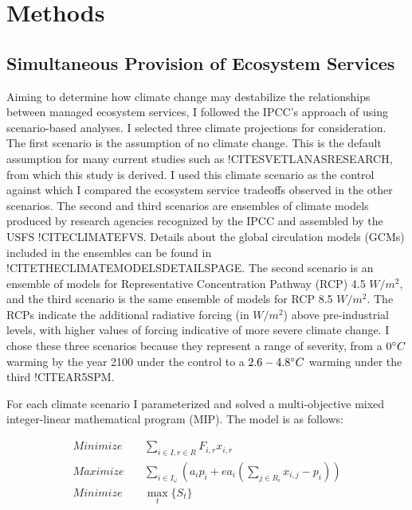 \section{Methods}
\subsection{Simultaneous Provision of Ecosystem Services}
\label{subsec:multiObjModel}
Aiming to determine how climate change may destabilize the relationships between managed ecosystem services, I followed the IPCC's approach of using scenario-based analyses. I selected three climate projections for consideration. The first scenario is the assumption of no climate change. This is the default assumption for many current studies such as !CITESVETLANASRESEARCH, from which this study is derived. I used this climate scenario as the control against which I  compared the ecosystem service tradeoffs observed in the other scenarios. The second and third scenarios are ensembles of climate models produced by research agencies recognized by the IPCC and assembled by the USFS !CITECLIMATEFVS. Details about the global circulation models (GCMs) included in the ensembles can be found in !CITETHECLIMATEMODELSDETAILSPAGE. The second scenario is an ensemble of models for Representative Concentration Pathway (RCP) 4.5 $W/m^2$, and the third scenario is the same ensemble of models for RCP 8.5 $W/m^2$. The RCPs indicate the additional radiative forcing (in $W/m^2$) above pre-industrial levels, with higher values of forcing indicative of more severe climate change. I chose these three scenarios because they represent a range of severity, from a $0 \degree C$ warming by the year 2100 under the control to a $2.6-4.8 \degree C$ warming under the third !CITEAR5SPM.

For each climate scenario I parameterized and solved a multi-objective mixed integer-linear mathematical program (MIP). The model is as follows:

\begin{align*}
Minimize \quad &\sum_{i\in I,r\in R} F_{i,r} x_{i,r} \\
Maximize \quad &\sum_{i\in I_\omega} \left(a_i p_i + e a_i \left( \sum_{j \in R_i} x_{i,j}-p_i \right) \right) \\
Minimize \quad &\max_t \{S_t\}
\end{align*}

